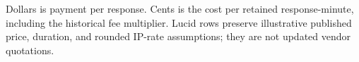 \begin{table}[htbp]\centering
\caption{Historical cost per IP-unflagged response-minute}
\par\smallskip
\noindent\small Dollars is payment per response. Cents is the cost per retained response-minute, including the historical fee multiplier. Lucid rows preserve illustrative published price, duration, and rounded IP-rate assumptions; they are not updated vendor quotations.\normalsize\end{table}
